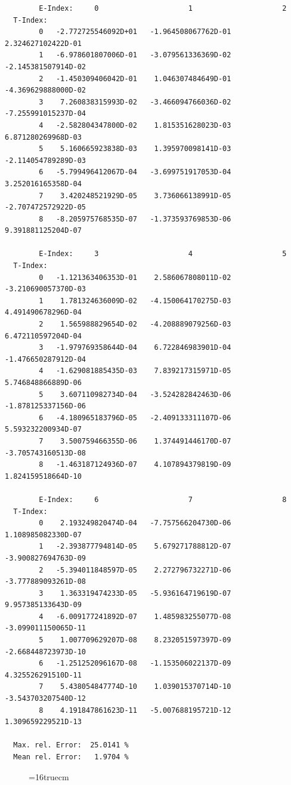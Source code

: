 \documentclass[12pt,dvips]{article}
\begin{document}
\begin{small}\begin{verbatim}
        E-Index:     0                     1                     2
  T-Index:
        0   -2.772725546092D+01   -1.964508067762D-01    2.324627102422D-01
        1   -6.978601807006D-01   -3.079561336369D-02   -2.145381507914D-02
        2   -1.450309406042D-01    1.046307484649D-01   -4.369629888000D-02
        3    7.260838315993D-02   -3.466094766036D-02   -7.255991015237D-04
        4   -2.582804347800D-02    1.815351628023D-03    6.871280269968D-03
        5    5.160665923838D-03    1.395970098141D-03   -2.114054789289D-03
        6   -5.799496412067D-04   -3.699751917053D-04    3.252016165358D-04
        7    3.420248521929D-05    3.736066138991D-05   -2.707472572922D-05
        8   -8.205975768535D-07   -1.373593769853D-06    9.391881125204D-07

        E-Index:     3                     4                     5
  T-Index:
        0   -1.121363406353D-01    2.586067808011D-02   -3.210690057370D-03
        1    1.781324636009D-02   -4.150064170275D-03    4.491490678296D-04
        2    1.565988829654D-02   -4.208889079256D-03    6.472110597204D-04
        3   -1.979769358644D-04    6.722846983901D-04   -1.476650287912D-04
        4   -1.629081885435D-03    7.839217315971D-05    5.746848866889D-06
        5    3.607110982734D-04   -3.524282842463D-06   -1.878125337156D-06
        6   -4.180965183796D-05   -2.409133311107D-06    5.593232200934D-07
        7    3.500759466355D-06    1.374491446170D-07   -3.705743160513D-08
        8   -1.463187124936D-07    4.107894379819D-09    1.824159518664D-10

        E-Index:     6                     7                     8
  T-Index:
        0    2.193249820474D-04   -7.757566204730D-06    1.108985082330D-07
        1   -2.393877794814D-05    5.679271788812D-07   -3.900827694763D-09
        2   -5.394011848597D-05    2.272796732271D-06   -3.777889093261D-08
        3    1.363319474233D-05   -5.936164719619D-07    9.957385133643D-09
        4   -6.009177241892D-07    1.485983255077D-08   -3.099011150065D-11
        5    1.007709629207D-08    8.232051597397D-09   -2.668448723973D-10
        6   -1.251252096167D-08   -1.153506022137D-09    4.325526291510D-11
        7    5.438054847774D-10    1.039015370714D-10   -3.543703207540D-12
        8    4.191847861623D-11   -5.007688195721D-12    1.309659229521D-13

  Max. rel. Error:  25.0141 %
  Mean rel. Error:   1.9704 %

\end{verbatim}\end{small}
\begin{figure} \label{2.3.18B1}
\epsfxsize=16truecm
\end{figure}
\newpage
\end{document}
